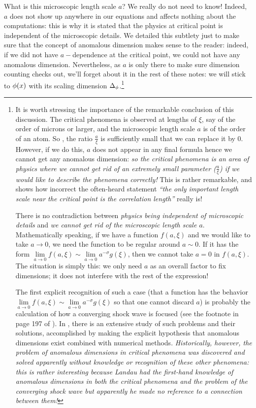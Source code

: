 What is this microscopic length scale $a$? We really do not need to know! Indeed, $a$ does not show up anywhere in our equations and affects nothing about the computations: this is why it is stated that the physics at critical point is independent of the microscopic details. We detailed this subtlety just to make sure that the concept of anomalous dimension makes sense to the reader: indeed, if we did not have $a-$dependence at the critical point, we could not have any anomalous dimension. Nevertheless, as $a$ is only there to make sure dimension counting checks out, we'll forget about it in the rest of these notes: we will stick to $\phi(x)$ with its scaling dimension $\Delta_\phi$.\footnote{
	It is worth stressing the importance of the remarkable conclusion of this discussion. The critical phenomena is observed at lengths of $\xi$, say of the order of microns or larger, and the microscopic length scale $a$ is of the order of an atom. So \naively, the ratio $\frac{a}{\xi}$ is sufficiently small that we can replace it by $0$. However, if we do this, $a$ does not appear in any final formula hence we cannot get any anomalous dimension: \emph{so the critical phenomena is an area of physics where we cannot get rid of an extremely small parameter ($\frac{a}{\xi}$) if we would like to describe the phenomena correctly!} This is rather remarkable, and shows how incorrect the often-heard statement \emph{``the only important length scale near the critical point is the correlation length''} really is!
	
	There is no contradiction between \emph{physics being independent of microscopic details} and \emph{we cannot get rid of the microscopic length scale $a$}. Mathematically speaking, if we have a function $f\left(a,\xi\right)$ and we would like to take $a\rightarrow 0$, we need the function to be regular around $a\sim 0$. If it has the form $\lim\limits_{a\rightarrow0}f\left(a,\xi\right)\sim \lim\limits_{a\rightarrow0}a^{-\sigma}g(\xi)$, then we cannot take $a=0$ in $f(a,\xi)$. The situation is simply this: we only need $a$ as an overall factor to fix dimensions; it does not interfere with the rest of the expression!
	
	The first explicit recognition of such a case (that a function has the behavior $\lim\limits_{a\rightarrow0}f\left(a,\xi\right)\sim \lim\limits_{a\rightarrow0}a^{-\sigma}g(\xi)$ so that one cannot discard $a$) is probably the calculation of how a converging shock wave is focused (see the footnote in page 197 of \cite{Goldenfeld:1992qy}). In \cite{barenblatt1996scaling}, there is an extensive study of such problems and their solutions, accomplished by making the explicit hypothesis that anomalous dimensions exist combined with numerical methods. \emph{Historically, however, the problem of anomalous dimensions in critical phenomena was discovered and solved apparently without knowledge or recognition of these other phenomena: this is rather interesting because Landau had the first-hand knowledge of anomalous dimensions in both the critical phenomena and the problem of the converging shock wave but apparently he made no reference to a connection between them!}
	
}
